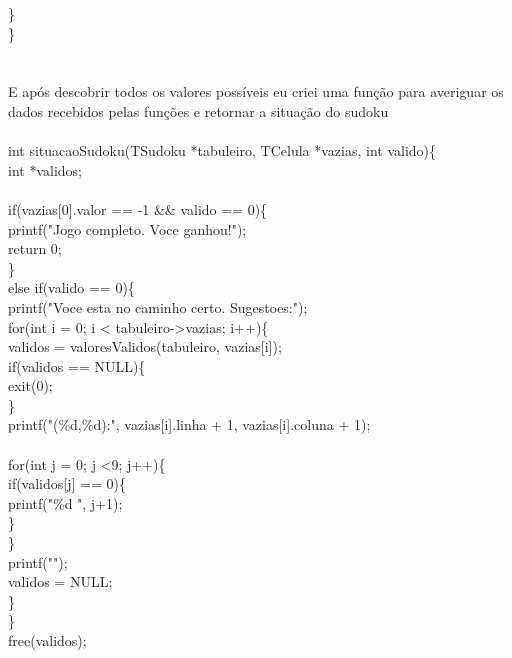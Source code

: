 \documentclass{article}
\begin{document}
        \}\\
    \}
\\\\\\E após descobrir todos os valores possíveis eu criei uma função para averiguar os dados recebidos pelas funções e retornar a situação do sudoku
\\\\int situacaoSudoku(TSudoku *tabuleiro, TCelula *vazias, int valido)\{\\
    int *validos;\\
   \\
    if(vazias[0].valor == -1 && valido == 0)\{\\
        printf("Jogo completo. Voce ganhou!\n");\\
        return 0;\\
    \}\\
    else if(valido == 0)\{\\
        printf("Voce esta no caminho certo. Sugestoes:\n");\\
        for(int i = 0; i < tabuleiro->vazias; i++)\{\\
            validos = valoresValidos(tabuleiro, vazias[i]);\\
            if(validos == NULL)\{\\
                exit(0);\\
            \}\\
            printf("(\%d,\%d):", vazias[i].linha + 1, vazias[i].coluna + 1);\\
           \\
            for(int j = 0; j <9; j++)\{\\
                if(validos[j] == 0)\{\\
                    printf("\%d ", j+1);\\
               \}\\
            \}\\
            printf("\n");\\
            validos = NULL;\\
        \}\\
    \}\\
    free(validos);\\
 
\end{document}
